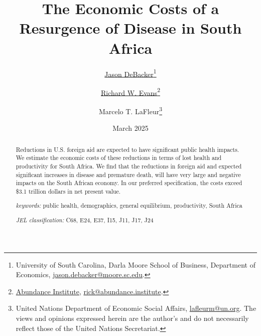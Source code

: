 \documentclass[letterpaper,12pt]{article}
\theoremstyle{definition}
\begin{document}
\begin{titlepage}
\title{The Economic Costs of a Resurgence of Disease in South Africa}
\date{March 2025}
\author{\href{http://jasondebacker.com/}{Jason DeBacker}\thanks{University of South Carolina, Darla Moore School of Business, Department of Economics, \href{mailto:jason.debacker@moore.sc.edu}{jason.debacker@moore.sc.edu}.}\and \href{https://sites.google.com/site/rickecon}{Richard W. Evans}\thanks{\href{https://abundance.institute/}{Abundance Institute}, \href{mailto:rick@abundance.institute}{rick@abundance.institute}.}\and {Marcelo T. LaFleur}\thanks{{United Nations Department of Economic Social Affairs}, \href{mailto:lafleurm@un.org}{lafleurm@un.org}. The views and opinions expressed herein are the author's and do not necessarily reflect those of the United Nations Secretariat.}}
\maketitle
\vspace{-2mm}
\begin{abstract}
\small{Reductions in U.S. foreign aid are expected to have significant public health impacts.  We estimate the economic costs of these reductions in terms of lost health and productivity for South Africa.  We find that the reductions in foreign aid and expected significant increases in disease and premature death, will have very large and negative impacts on the South African economy.  In our preferred specification, the costs exceed \$3.1 trillion dollars in net present value.}

\vspace{10mm}

\noindent\textit{keywords:}\: public health, demographics, general equilibrium, productivity, South Africa

\vspace{10mm}

\noindent\textit{JEL classification:} C68, E24, E37, I15, J11, J17, J24


\end{abstract}
\thispagestyle{empty}
\end{titlepage}
\end{document}
